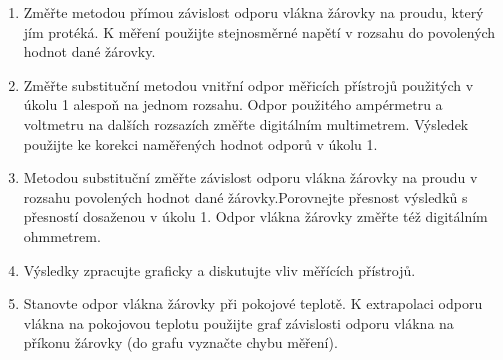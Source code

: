 \documentclass[0-protokol.tex]{subfiles}
\begin{document}
\begin{enumerate}
\item Změřte metodou přímou závislost odporu vlákna žárovky na proudu, který jím protéká. K měření použijte stejnosměrné napětí v rozsahu do povolených hodnot dané žárovky.
\item Změřte substituční metodou vnitřní odpor měřicích přístrojů použitých v úkolu 1 alespoň na jednom rozsahu. Odpor použitého ampérmetru a voltmetru na dalších rozsazích změřte digitálním multimetrem. Výsledek použijte ke korekci naměřených hodnot odporů v úkolu 1.
\item Metodou substituční změřte závislost odporu vlákna žárovky na proudu v rozsahu povolených hodnot dané žárovky.Porovnejte přesnost výsledků s přesností dosaženou v úkolu 1. Odpor vlákna žárovky změřte též digitálním ohmmetrem.
\item Výsledky zpracujte graficky a diskutujte vliv měřících přístrojů.
\item Stanovte odpor vlákna žárovky při pokojové teplotě. K extrapolaci odporu vlákna na pokojovou teplotu použijte graf závislosti odporu vlákna na příkonu žárovky (do grafu vyznačte chybu měření).
\end{enumerate}
\end{document}
